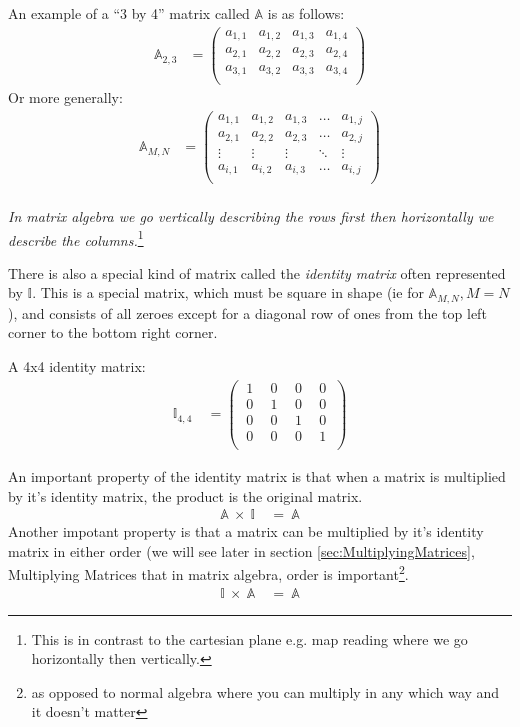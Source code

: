 An example of a ``3 by 4'' matrix called $\mathbb{A}$ is as follows:
\begin{align}
\mathbb{A}_{2,3} & = 
\begin{pmatrix}
  a_{1,1}   &   a_{1,2}   &   a_{1,3}   &   a_{1,4}   \\
  a_{2,1}   &   a_{2,2}   &   a_{2,3}   &   a_{2,4}   \\
  a_{3,1}   &   a_{3,2}   &   a_{3,3}   &   a_{3,4}   \\
\end{pmatrix}
\end{align}
Or more generally:
\begin{align}
\mathbb{A}_{M,N} & = 
\begin{pmatrix}
  a_{1,1}   &   a_{1,2}   &   a_{1,3}   &   \ldots   &   a_{1,j}   \\
  a_{2,1}   &   a_{2,2}   &   a_{2,3}   &   \ldots   &   a_{2,j}   \\
  \vdots    &   \vdots    &   \vdots    &   \ddots   &   \vdots    \\
  a_{i,1}   &   a_{i,2}   &   a_{i,3}   &   \ldots   &   a_{i,j}   \\
\end{pmatrix}
\label{eq:FormOfMatrices}
\end{align}
\\
\emph{In matrix algebra we go vertically describing the rows first then
horizontally we describe the columns.}\footnote{This is in contrast to the
cartesian plane e.g. map reading where we go horizontally then vertically.}

There is also a special kind of matrix called the \emph{identity matrix} often
represented by $\mathbb{I}$. This is a special matrix, which must be square in
shape (ie for $\mathbb{A}_{M,N}, M = N$), and consists of all zeroes except for
a diagonal row of ones from the top left corner to the bottom right corner.

A 4x4 identity matrix:
\begin{align}
  \mathbb{I}_{4,4}~&=
  \begin{pmatrix}
    ~1~&~0~&~0~&~0~\\
    ~0~&~1~&~0~&~0~\\
    ~0~&~0~&~1~&~0~\\
    ~0~&~0~&~0~&~1~\\
  \end{pmatrix}
  \label{eq:4x4IdentityMatrix}
\end{align}

An important property of the identity matrix is that when a matrix is multiplied
by it's identity matrix, the product is the original matrix.
\begin{align}
  \mathbb{A}~\times~\mathbb{I}~&=~\mathbb{A}
\end{align}
Another impotant property is that a matrix can be multiplied by it's identity
matrix in either order (we will see later in section
\ref{sec:MultiplyingMatrices}, Multiplying Matrices that in matrix
algebra, order is important\footnote{as opposed to normal algebra where you can
multiply in any which way and it doesn't matter}.
\begin{align}
  \mathbb{I}~\times~\mathbb{A}~&=~\mathbb{A}
\end{align}

